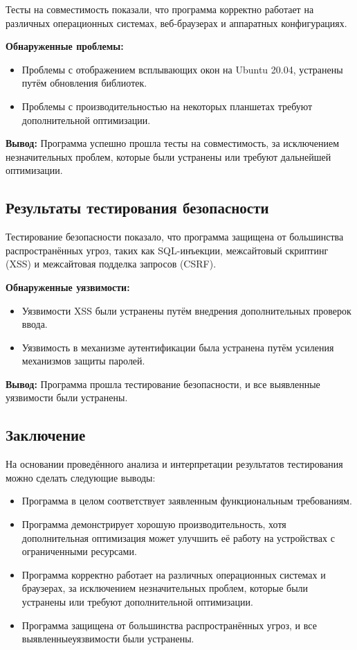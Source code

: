 \documentclass{article}
\begin{document}
\begin{itemize}
    Тесты на совместимость показали, что программа корректно работает на различных операционных системах, веб-браузерах и аппаратных конфигурациях.

    \textbf{Обнаруженные проблемы:}

    \begin{itemize}
        \item Проблемы с отображением всплывающих окон на Ubuntu 20.04, устранены путём обновления библиотек.
        \item Проблемы с производительностью на некоторых планшетах требуют дополнительной оптимизации.
    \end{itemize}

    \textbf{Вывод:} Программа успешно прошла тесты на совместимость, за исключением незначительных проблем, которые были устранены или требуют дальнейшей оптимизации.

    \subsection{Результаты тестирования безопасности}

    Тестирование безопасности показало, что программа защищена от большинства распространённых угроз, таких как SQL-инъекции, межсайтовый скриптинг (XSS) и межсайтовая подделка запросов (CSRF).

    \textbf{Обнаруженные уязвимости:}

    \begin{itemize}
        \item Уязвимости XSS были устранены путём внедрения дополнительных проверок ввода.
        \item Уязвимость в механизме аутентификации была устранена путём усиления механизмов защиты паролей.
    \end{itemize}

    \textbf{Вывод:} Программа прошла тестирование безопасности, и все выявленные уязвимости были устранены.

    \subsection{Заключение}

    На основании проведённого анализа и интерпретации результатов тестирования можно сделать следующие выводы:

    \begin{itemize}
        \item Программа в целом соответствует заявленным функциональным требованиям.
        \item Программа демонстрирует хорошую производительность, хотя дополнительная оптимизация может улучшить её работу на устройствах с ограниченными ресурсами.
        \item Программа корректно работает на различных операционных системах и браузерах, за исключением незначительных проблем, которые были устранены или требуют дополнительной оптимизации.
        \item Программа защищена от большинства распространённых угроз, и все выявленныеуязвимости были устранены.
    \end{itemize}


\end{itemize}
\end{document}
